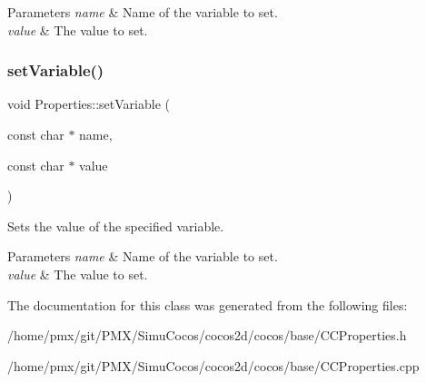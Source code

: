 \begin{DoxyParams}{Parameters}
{\em name} & Name of the variable to set. \\
\hline
{\em value} & The value to set. \\
\hline
\end{DoxyParams}
\mbox{\label{classProperties_aea588dde95d1d4767d981a2530a202b0}} 
\subsubsection{\texorpdfstring{set\+Variable()}{setVariable()}\hspace{0.1cm}{\footnotesize\ttfamily [2/2]}}
{\footnotesize\ttfamily void Properties\+::set\+Variable (\begin{DoxyParamCaption}\item[{const char $\ast$}]{name,  }\item[{const char $\ast$}]{value }\end{DoxyParamCaption})}

Sets the value of the specified variable.


\begin{DoxyParams}{Parameters}
{\em name} & Name of the variable to set. \\
\hline
{\em value} & The value to set. \\
\hline
\end{DoxyParams}


The documentation for this class was generated from the following files\+:\begin{DoxyCompactItemize}
\item 
/home/pmx/git/\+P\+M\+X/\+Simu\+Cocos/cocos2d/cocos/base/C\+C\+Properties.\+h\item 
/home/pmx/git/\+P\+M\+X/\+Simu\+Cocos/cocos2d/cocos/base/C\+C\+Properties.\+cpp\end{DoxyCompactItemize}
